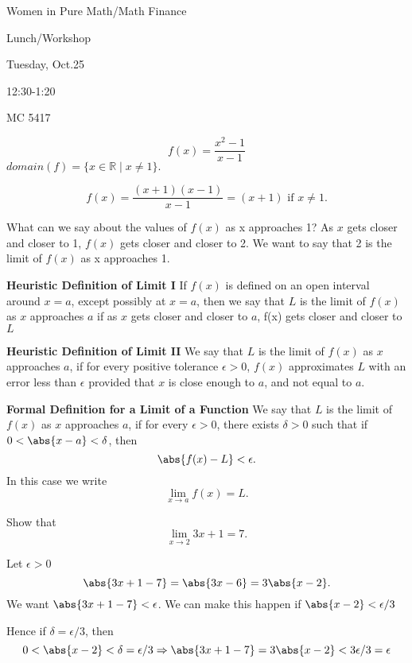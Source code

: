 Women in Pure Math/Math Finance

Lunch/Workshop

Tuesday, Oct.25

12:30-1:20

MC 5417

\begin{exmp}
\[f(x) = \frac{x^2-1}{x-1}\]
$domain(f) = \{x\in\mathbb{R} \mid x\neq 1\}.$
\end{exmp}
\begin{note}
\[f(x) = \frac{(x+1)(x-1)}{x-1} = (x+1) \text{ if } x\neq 1.\]
\end{note}

What can we say about the values of $f(x)$ as x approaches 1? As $x$ gets closer and closer to 1, $f(x)$ gets closer and closer to 2. We want to say that 2 is the limit of $f(x)$ as x approaches 1.

\begin{defn}
\textbf{Heuristic Definition of Limit I} If $f(x)$ is defined on an open interval around $x = a$, except possibly at $x=a$, then we say that $L$ is the limit of $f(x)$ as $x$ approaches $a$ if as $x$ gets closer and closer to $a$, f(x) gets closer and closer to $L$
\end{defn}

\begin{defn}
\textbf{Heuristic Definition of Limit II} We say that $L$ is the limit of $f(x)$ as $x$ approaches $a$, if for every positive tolerance $\epsilon > 0$, $f(x)$ approximates $L$ with an error less than $\epsilon$ provided that $x$ is close enough to $a$, and not equal to $a$.
\end{defn}

\begin{defn}
\textbf{Formal Definition for a Limit of a Function} We say that $L$ is the limit of $f(x)$ as $x$ approaches $a$, if for every $\epsilon > 0$, there exists $\delta > 0$ such that if $0<\abs{x-a} < \delta$, then \[\abs{f(x) - L} < \epsilon.\]
In this case we write \[\lim_{x\to a} f(x) = L.\]
\end{defn}

\begin{exmp}
Show that \[\lim_{x\to 2}3x + 1 = 7.\]
\end{exmp}
\begin{solution}
Let $\epsilon > 0$
    \[\abs{3x+1 -7} = \abs{3x - 6} = 3\abs{x-2}.\]
We want $\abs{3x+1 -7} < \epsilon$. We can make this happen if $\abs{x-2} < \epsilon / 3$

Hence if $\delta = \epsilon / 3$, then 
\[0 < \abs{x-2} < \delta = \epsilon / 3 \Rightarrow \abs{3x+1-7} = 3 \abs{x-2} < 3 \epsilon / 3 = \epsilon\]
\end{solution}

